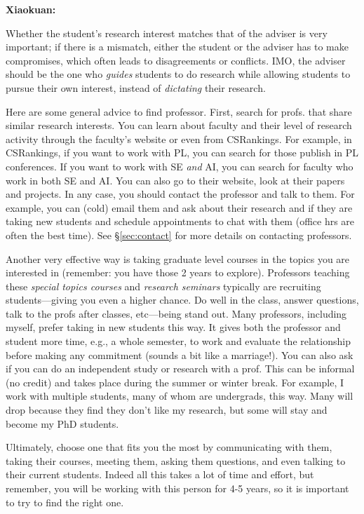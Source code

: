 \documentclass[oneside,11pt]{memoir}
\newenvironment{commentbox}[1][]{
\small
    \begin{mybox}
    {\small \textbf{#1}}
 }{
   \end{mybox}
}
\begin{document}
\begin{commentbox}[Xiaokuan:]
    Whether the student's research interest matches that of the adviser is very important;
    if there is a mismatch,
    either the student or the adviser has to make compromises,
    which often leads to disagreements or conflicts. 
    IMO, the adviser should be the one who \emph{guides}  students to do research while allowing students to pursue their own interest,
    instead of \emph{dictating} their research.
    \end{commentbox}

Here are some general advice to find professor.  First, search for profs. that share similar research interests. You can learn about faculty and their level of research activity through the faculty's website or even from CSRankings.  For example, in CSRankings, if you want to work with PL, you can search for those publish in PL conferences.  If you want to work with SE \emph{and} AI, you can search for faculty who work in both SE and AI.   You can also go to their website, look at their papers and projects.  In any case, you should contact the professor and talk to them. For example, you can (cold) email them and ask about their research and if they are taking new students and schedule appointments to chat with them (office hrs are often the best time).  See \S\ref{sec:contact} for more details on contacting professors.  

Another very effective way is taking graduate level courses in the topics you are interested in (remember: you have those 2 years to explore).  Professors teaching these \emph{special topics courses} and \emph{research seminars} typically are recruiting students---giving you even a higher chance. Do well in the class, answer questions, talk to the profs after classes, etc---being stand out.  Many professors, including myself, prefer taking in new students this way.  It gives both the professor and student more time, e.g., a whole semester, to work and evaluate the relationship before making any commitment (sounds a bit like a marriage!).  
You can also ask if you can do an independent study or research with a prof. This can be informal (no credit) and takes place during the summer or winter break.  For example, I work with multiple students, many of whom are undergrads, this way. Many will drop because they find they don't like my research, but some will stay and become my PhD students.

Ultimately, choose one that fits you the most by communicating with them, taking their courses, meeting them, asking them questions, and even talking to their current students. Indeed all this takes a lot of time and effort, but remember, you will be working with this person for 4-5 years, so it is important to try to find the right one. 
\end{document}
